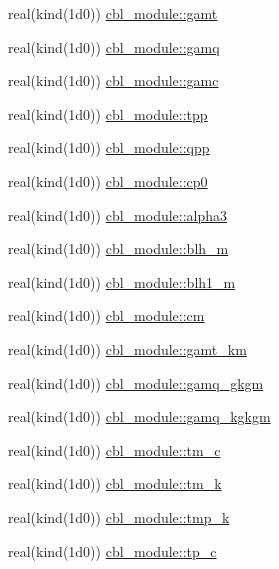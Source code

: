 \begin{DoxyCompactItemize}
\item 
real(kind(1d0)) \hyperlink{namespacecbl__module_ab55715333b9dc4e5699d418ce9aa6eca}{cbl\+\_\+module\+::gamt}
\item 
real(kind(1d0)) \hyperlink{namespacecbl__module_a2f0b130ab9a329454293c11707b4f89f}{cbl\+\_\+module\+::gamq}
\item 
real(kind(1d0)) \hyperlink{namespacecbl__module_a999c82d729d623cf9e734d5b8f60413b}{cbl\+\_\+module\+::gamc}
\item 
real(kind(1d0)) \hyperlink{namespacecbl__module_a32c6cd32a6011ce9ce3536df1935b6ba}{cbl\+\_\+module\+::tpp}
\item 
real(kind(1d0)) \hyperlink{namespacecbl__module_a532658820cffbe2b75b727fb9e55d779}{cbl\+\_\+module\+::qpp}
\item 
real(kind(1d0)) \hyperlink{namespacecbl__module_a01651700bba3680529190559891e308f}{cbl\+\_\+module\+::cp0}
\item 
real(kind(1d0)) \hyperlink{namespacecbl__module_ab09c1f0f6b67d7bdf17278e617fc35ba}{cbl\+\_\+module\+::alpha3}
\item 
real(kind(1d0)) \hyperlink{namespacecbl__module_a20477a72c625deb14eccf5e2cd767d95}{cbl\+\_\+module\+::blh\+\_\+m}
\item 
real(kind(1d0)) \hyperlink{namespacecbl__module_a19dd722436e710830c7ff6b961753c62}{cbl\+\_\+module\+::blh1\+\_\+m}
\item 
real(kind(1d0)) \hyperlink{namespacecbl__module_ab5d6f31d2f9b523336fb0947a1e53707}{cbl\+\_\+module\+::cm}
\item 
real(kind(1d0)) \hyperlink{namespacecbl__module_a86a03f05040f82f59951951ed8feb92d}{cbl\+\_\+module\+::gamt\+\_\+km}
\item 
real(kind(1d0)) \hyperlink{namespacecbl__module_a6aab251dd8f51c9cd6a8dc723a99fdf3}{cbl\+\_\+module\+::gamq\+\_\+gkgm}
\item 
real(kind(1d0)) \hyperlink{namespacecbl__module_a1ce0de96513d92e7be4a7b0318a7102a}{cbl\+\_\+module\+::gamq\+\_\+kgkgm}
\item 
real(kind(1d0)) \hyperlink{namespacecbl__module_a9981080497583b5953927b0a2bbdcde8}{cbl\+\_\+module\+::tm\+\_\+c}
\item 
real(kind(1d0)) \hyperlink{namespacecbl__module_afb21accdfbc0b24e12b24a44ffd9d6d1}{cbl\+\_\+module\+::tm\+\_\+k}
\item 
real(kind(1d0)) \hyperlink{namespacecbl__module_a8cbccf2c4274c8e254bdd331947d39b8}{cbl\+\_\+module\+::tmp\+\_\+k}
\item 
real(kind(1d0)) \hyperlink{namespacecbl__module_a7b92d87a613cb13145b7c84beced7f67}{cbl\+\_\+module\+::tp\+\_\+c}

\end{DoxyCompactItemize}
